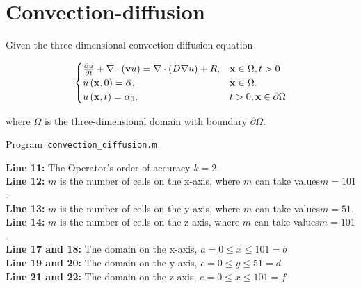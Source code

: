 \section{Convection-diffusion}
Given the three-dimensional convection diffusion equation

\begin{equation}\label{eq:IBVP3d}
	\begin{cases}
		\diffp{u}{t} + \nabla \cdot (\textbf{v} u) = \nabla \cdot (D \nabla u) + R,
		                                              & \textbf{x} \in \Omega, t > 0          \\
		u\left( \textbf{x},0\right)= \bar{\alpha},
		                                              & \textbf{x} \in  \Omega.               \\
		u\left(\textbf{x},t\right)= \bar{\alpha}_{0}, & t >0, \textbf{x} \in \partial  \Omega
	\end{cases}
\end{equation}

where  $\Omega$  is the three-dimensional domain with  boundary $\partial  \Omega $.

\begin{listing}[ht!]
	\tiny
	\centering
	\caption{Program~\texttt{convection\_diffusion.m}}
	\label{code:convection_diffusion.m}
\end{listing}

\textbf{Line 11:} The Operator's order of accuracy $k = 2$.\\

\textbf{Line 12:} $m$ is the number of cells on the x-axis, where $m$ can take values ​​$m= 101$.\\

\textbf{Line 13:} $m$ is the number of cells on the y-axis, where $m$ can take values ​​$m= 51$.\\

\textbf{Line 14:} $m$ is the number of cells on the z-axis, where $m$ can take values ​​$m= 101$.\\

\textbf{Line 17 and 18:} The domain on the  x-axis, $a=0 \leq x \leq 101=b$\\

\textbf{Line 19 and 20:} The domain on the  y-axis, $c=0 \leq y \leq 51=d$\\

\textbf{Line 21 and 22:} The domain on the  z-axis, $e=0 \leq x \leq 101=f$\\

